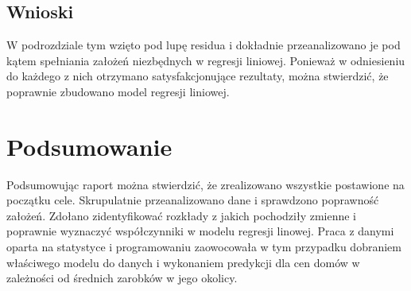 \documentclass{article}
\begin{document}
\subsection{Wnioski}
W podrozdziale tym wzięto pod lupę residua i dokładnie przeanalizowano je pod kątem spełniania założeń niezbędnych w regresji liniowej. Ponieważ w odniesieniu do każdego z nich otrzymano satysfakcjonujące rezultaty, można stwierdzić, że poprawnie zbudowano model regresji liniowej.
\section{Podsumowanie}
Podsumowując raport można stwierdzić, że zrealizowano wszystkie postawione na początku cele. Skrupulatnie przeanalizowano dane i sprawdzono poprawność założeń. Zdołano zidentyfikować rozkłady z jakich pochodziły zmienne i poprawnie wyznaczyć współczynniki w modelu regresji linowej. Praca z danymi oparta na statystyce i programowaniu zaowocowała w tym przypadku dobraniem właściwego modelu do danych i wykonaniem predykcji dla cen domów w zależności od średnich zarobków w jego okolicy. 
\end{document}
